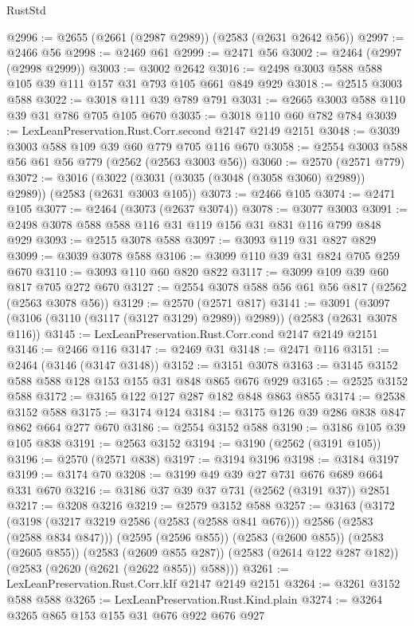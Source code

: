 \begin{lexlean}{RustStd}
\begin{coremodule}
{\begin{coremodule}
{{{{{{{{{{{{{{{@2996 := @2655 (@2661 (@2987 @2989)) (@2583 (@2631 @2642 @56))
@2997 := @2466 @56
@2998 := @2469 @61
@2999 := @2471 @56
@3002 := @2464 (@2997 (@2998 @2999))
@3003 := @3002 @2642
@3016 := @2498 @3003 @588 @588 @105 @39 @111 @157 @31 @793 @105 @661 @849 @929
@3018 := @2515 @3003 @588
@3022 := @3018 @111 @39 @789 @791
@3031 := @2665 @3003 @588 @110 @39 @31 @786 @705 @105 @670
@3035 := @3018 @110 @60 @782 @784
@3039 := LexLeanPreservation.Rust.Corr.second @2147 @2149 @2151
@3048 := @3039 @3003 @588 @109 @39 @60 @779 @705 @116 @670
@3058 := @2554 @3003 @588 @56 @61 @56 @779 (@2562 (@2563 @3003 @56))
@3060 := @2570 (@2571 @779)
@3072 := @3016 (@3022 (@3031 (@3035 (@3048 (@3058 @3060) @2989)) @2989)) (@2583 (@2631 @3003 @105))
@3073 := @2466 @105
@3074 := @2471 @105
@3077 := @2464 (@3073 (@2637 @3074))
@3078 := @3077 @3003
@3091 := @2498 @3078 @588 @588 @116 @31 @119 @156 @31 @831 @116 @799 @848 @929
@3093 := @2515 @3078 @588
@3097 := @3093 @119 @31 @827 @829
@3099 := @3039 @3078 @588
@3106 := @3099 @110 @39 @31 @824 @705 @259 @670
@3110 := @3093 @110 @60 @820 @822
@3117 := @3099 @109 @39 @60 @817 @705 @272 @670
@3127 := @2554 @3078 @588 @56 @61 @56 @817 (@2562 (@2563 @3078 @56))
@3129 := @2570 (@2571 @817)
@3141 := @3091 (@3097 (@3106 (@3110 (@3117 (@3127 @3129) @2989)) @2989)) (@2583 (@2631 @3078 @116))
@3145 := LexLeanPreservation.Rust.Corr.cond @2147 @2149 @2151
@3146 := @2466 @116
@3147 := @2469 @31
@3148 := @2471 @116
@3151 := @2464 (@3146 (@3147 @3148))
@3152 := @3151 @3078
@3163 := @3145 @3152 @588 @588 @128 @153 @155 @31 @848 @865 @676 @929
@3165 := @2525 @3152 @588
@3172 := @3165 @122 @127 @287 @182 @848 @863 @855
@3174 := @2538 @3152 @588
@3175 := @3174 @124
@3184 := @3175 @126 @39 @286 @838 @847 @862 @664 @277 @670
@3186 := @2554 @3152 @588
@3190 := @3186 @105 @39 @105 @838
@3191 := @2563 @3152
@3194 := @3190 (@2562 (@3191 @105))
@3196 := @2570 (@2571 @838)
@3197 := @3194 @3196
@3198 := @3184 @3197
@3199 := @3174 @70
@3208 := @3199 @49 @39 @27 @731 @676 @689 @664 @331 @670
@3216 := @3186 @37 @39 @37 @731 (@2562 (@3191 @37)) @2851
@3217 := @3208 @3216
@3219 := @2579 @3152 @588
@3257 := @3163
    (@3172
      (@3198 (@3217 @3219 @2586 (@2583 (@2588 @841 @676))) @2586 (@2583 (@2588 @834 @847)))
      (@2595 (@2596 @855))
      (@2583 (@2600 @855))
      (@2583 (@2605 @855))
      (@2583 (@2609 @855 @287))
      (@2583 (@2614 @122 @287 @182))
      (@2583 (@2620 (@2621 (@2622 @855)) @588)))
@3261 := LexLeanPreservation.Rust.Corr.kIf @2147 @2149 @2151
@3264 := @3261 @3152 @588 @588
@3265 := LexLeanPreservation.Rust.Kind.plain
@3274 := @3264 @3265 @865 @153 @155 @31 @676 @922 @676 @927
}}}}}}}}}}}}}}}
\end{coremodule}}
\end{coremodule}
\end{lexlean}
